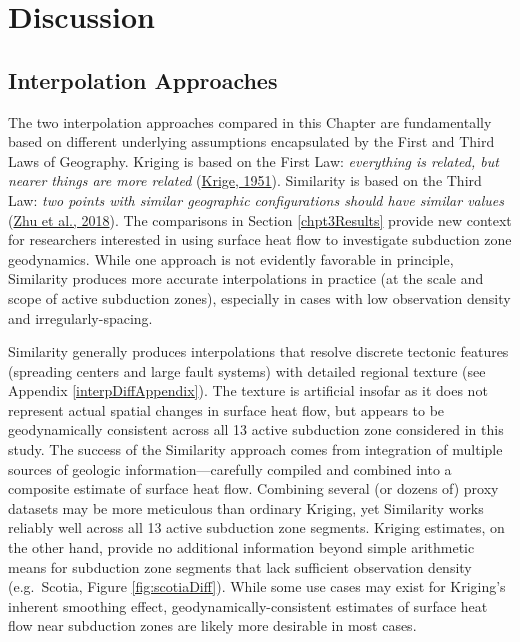 \clearpage

\hypertarget{discussion}{%
\section{Discussion}\label{discussion}}

\hypertarget{interpolation-approaches}{%
\subsection{Interpolation Approaches}\label{interpolation-approaches}}

The two interpolation approaches compared in this Chapter are fundamentally based on different underlying assumptions encapsulated by the First and Third Laws of Geography. Kriging is based on the First Law: \emph{everything is related, but nearer things are more related} (\protect\hyperlink{ref-krige1951}{Krige, 1951}). Similarity is based on the Third Law: \emph{two points with similar geographic configurations should have similar values} (\protect\hyperlink{ref-zhu2018}{Zhu et al., 2018}). The comparisons in Section \ref{chpt3Results} provide new context for researchers interested in using surface heat flow to investigate subduction zone geodynamics. While one approach is not evidently favorable in principle, Similarity produces more accurate interpolations in practice (at the scale and scope of active subduction zones), especially in cases with low observation density and irregularly-spacing.

Similarity generally produces interpolations that resolve discrete tectonic features (spreading centers and large fault systems) with detailed regional texture (see Appendix \ref{interpDiffAppendix}). The texture is artificial insofar as it does not represent actual spatial changes in surface heat flow, but appears to be geodynamically consistent across all 13 active subduction zone considered in this study. The success of the Similarity approach comes from integration of multiple sources of geologic information---carefully compiled and combined into a composite estimate of surface heat flow. Combining several (or dozens of) proxy datasets may be more meticulous than ordinary Kriging, yet Similarity works reliably well across all 13 active subduction zone segments. Kriging estimates, on the other hand, provide no additional information beyond simple arithmetic means for subduction zone segments that lack sufficient observation density (e.g.~Scotia, Figure \ref{fig:scotiaDiff}). While some use cases may exist for Kriging's inherent smoothing effect, geodynamically-consistent estimates of surface heat flow near subduction zones are likely more desirable in most cases.

